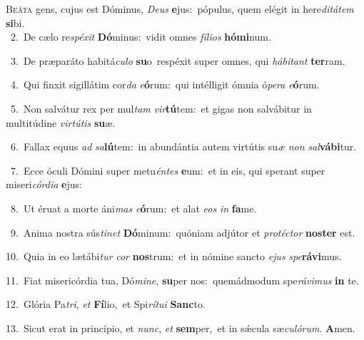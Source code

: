 \lettrine{\initial\textcolor{\initialcolor}{B}}{eáta} gens, cujus est Dóminus, \textit{De}\-\textit{us} \textbf{e}\-jus:~\star pópulus, quem elégit in here\-\textit{di}\-\textit{tá}\textit{tem} \textbf{si}\-bi.\\
{\numbfont\textcolor{\numbcolor}{~2.}}~De cælo re\-\textit{spé}\-\textit{xit} \textbf{Dó}\-minus:~\star vidit omnes \textit{fí}\-\textit{li}\textit{os} \textbf{hó}\-\textbf{mi}num.\par
{\numbfont\textcolor{\numbcolor}{~3.}}~De præparáto habitá\-\textit{cu}\-\textit{lo} \textbf{su}\-o~\star respéxit super omnes, qui \textit{há}\-\textit{bi}\textit{tant} \textbf{ter}\-ram.\par
{\numbfont\textcolor{\numbcolor}{~4.}}~Qui finxit sigillátim cor\textit{da} \textit{e}\-\textbf{ó}rum:~\star qui intélligit ómnia ó\-\textit{pe}\-\textit{ra} \textit{e}\-\textbf{ó}rum.\par
{\numbfont\textcolor{\numbcolor}{~5.}}~Non salvátur rex per mul\textit{tam} \textit{vir}\-\textbf{tú}tem:~\star et gigas non salvábitur in multitúdine \textit{vir}\-\textit{tú}\textit{tis} \textbf{su}\-æ.\par
{\numbfont\textcolor{\numbcolor}{~6.}}~Fallax equus \textit{ad} \textit{sa}\-\textbf{lú}tem:~\star in abundántia autem virtútis su\textit{æ} \textit{non} \textit{sal}\-\textbf{vá}\textbf{bi}tur.\par
{\numbfont\textcolor{\numbcolor}{~7.}}~Ecce óculi Dómini super metu\-\textit{én}\-\textit{tes} \textbf{e}\-um:~\star et in eis, qui sperant super miseri\-\textit{cór}\-\textit{di}\textit{a} \textbf{e}\-jus:\par
{\numbfont\textcolor{\numbcolor}{~8.}}~Ut éruat a morte áni\textit{mas} \textit{e}\-\textbf{ó}rum:~\star et alat \textit{e}\-\textit{os} \textit{in} \textbf{fa}\-me.\par
{\numbfont\textcolor{\numbcolor}{~9.}}~Anima nostra sús\-\textit{ti}\-\textit{net} \textbf{Dó}\-minum:~\star quóniam adjútor et \textit{pro}\-\textit{téc}\textit{tor} \textbf{nos}\-\textbf{ter} est.\par
{\numbfont\textcolor{\numbcolor}{10.}}~Quia in eo lætábi\textit{tur} \textit{cor} \textbf{nos}\-trum:~\star et in nómine sancto \textit{e}\-\textit{jus} \textit{spe}\-\textbf{rá}\textbf{vi}mus.\par
{\numbfont\textcolor{\numbcolor}{11.}}~Fiat misericórdia tua, Dó\-\textit{mi}\-\textit{ne}, \textbf{su}\-per nos:~\star quemádmodum spe\-\textit{rá}\-\textit{vi}\textit{mus} \textbf{in} te.\par
{\numbfont\textcolor{\numbcolor}{12.}}~Glória Pa\-\textit{tri}\-, \textit{et} \textbf{Fí}\-lio,~\star et Spi\-\textit{rí}\-\textit{tu}\textit{i} \textbf{Sanc}\-to.\par
{\numbfont\textcolor{\numbcolor}{13.}}~Sicut erat in princípio, et \textit{nunc}\-, \textit{et} \textbf{sem}\-per,~\star et in sǽcula sæ\-\textit{cu}\-\textit{ló}\textit{rum}. \textbf{A}\-men.\par
